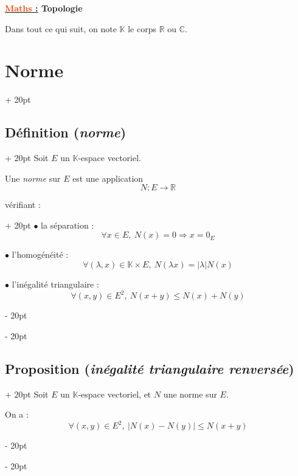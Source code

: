 \documentclass[a4paper, 12pt, twoside]{article}
\newcommand{\Emph}{\textcolor{ff4500}}
\newcommand{\R}{\mathbb{R}} %
\newcommand{\C}{\mathbb{C}} %
\newcommand{\K}{\mathbb K}
\newcommand{\abs}[1]{\left\lvert #1 \right\rvert}
\renewcommand{\le}{\leqslant}
\newcommand{\ind}[1][20pt]{\advance\leftskip + #1}
\newcommand{\deind}[1][20pt]{\advance\leftskip - #1}
\newenvironment{indt}[2][20pt]{#2 \par \ind[#1]}{\par \deind} %
\newcommand{\thetitle}[2]{\begin{center}\textbf{{\LARGE \underline{\Emph{#1} :}} {\Large #2}}\end{center}}
\begin{document}
    
    \thetitle{Maths}{Topologie}
    
    \tableofcontents
    \newpage

    Dans tout ce qui suit, on note $\K$ le corps $\R$ ou $\C$.
    
    \begin{indt}{\section{Norme}}
        \begin{indt}{\subsection{Définition (\textit{norme})}}
            Soit $E$ un $\K$-espace vectoriel.

            Une \emph{norme} sur $E$ est une application
            \[
                N : E \longrightarrow \R
            \]

            \begin{indt}{vérifiant :}
                $\bullet$ la séparation :
                \[
                    \forall x \in E,\ N(x) = 0 \Rightarrow x = 0_E
                \]

                $\bullet$ l'homogénéité :
                \[
                    \forall (\lambda, x) \in \K \times E,\ N(\lambda x) = \abs \lambda N(x)
                \]

                $\bullet$ l'inégalité triangulaire :
                \[
                    \forall (x, y) \in E^2,\ N(x + y) \le N(x) + N(y)
                \]
            \end{indt}
        \end{indt}

        \vspace{12pt}
        
        \begin{indt}{\subsection{Proposition (\textit{inégalité triangulaire renversée})}}
            Soit $E$ un $\K$-espace vectoriel, et $N$ une norme sur $E$.

            On a :
            \[
                \forall (x, y) \in E^2,\ \abs{N(x) - N(y)} \le N(x + y)
            \]
        \end{indt}

        \vspace{12pt}
        

\end{indt}
\end{document}
